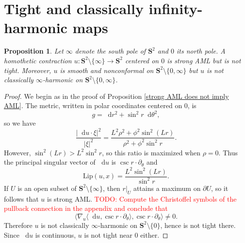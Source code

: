 \documentclass[reqno,11pt]{amsart}
\newcommand{\Sph}{\mathbf S}
\newcommand*\dif{\mathop{}\!\mathrm{d}}
\newcommand{\Lip}{\mathrm{Lip}}
\newtheorem{proposition}[theorem]{Proposition}
\theoremstyle{definition}
\numberwithin{equation}{section}
\newcommand\todo[1]{\textcolor{red}{TODO: #1}}
\begin{document}
\section{Tight and classically infinity-harmonic maps}
\begin{proposition}
Let $\infty$ denote the south pole of $\Sph^2$ and $0$ its north pole. 
A homothetic contraction $u: \Sph^2 \setminus \{\infty\} \to \Sph^2$ centered on $0$ is strong AML but is not tight.
Moreover, $u$ is smooth and nonconformal on $\Sph^2 \setminus \{0, \infty\}$ but $u$ is not classically $\infty$-harmonic on $\Sph^2 \setminus \{0, \infty\}$.
\end{proposition}
\begin{proof}
We begin as in the proof of Proposition \ref{strong AML does not imply AML}.
The metric, written in polar coordinates centered on $0$, is 
$$g = \dif r^2 + \sin^2 r \dif \theta^2,$$
so we have 
$$\frac{|\dif u \cdot \xi|^2}{|\xi|^2} = \frac{L^2 \rho^2 + \phi^2 \sin^2(Lr)}{\rho^2 + \phi^2 \sin^2 r}.$$
However, $\sin^2 (Lr) > L^2 \sin^2 r$, so this ratio is maximized when $\rho = 0$.
Thus the principal singular vector of $\dif u$ is $\csc r \cdot \partial_\theta$ and
$$\Lip(u, x) = \frac{L^2 \sin^2 (Lr)}{\sin^2 r}.$$
If $U$ is an open subset of $\Sph^2 \setminus \{\infty\}$, then $r|_U$ attains a maximum on $\partial U$, so it follows that $u$ is strong AML.
\todo{Compute the Christoffel symbols of the pullback connection in the appendix and conclude that }
$$\langle \nabla_u \langle \dif u, \csc r \cdot \partial_\theta\rangle, \csc r \cdot \partial_\theta\rangle \neq 0.$$
Therefore $u$ is not classically $\infty$-harmonic on $\Sph^2 \setminus \{0\}$, hence is not tight there.
Since $\dif u$ is continuous, $u$ is not tight near $0$ either.
\end{proof}
\end{document}
